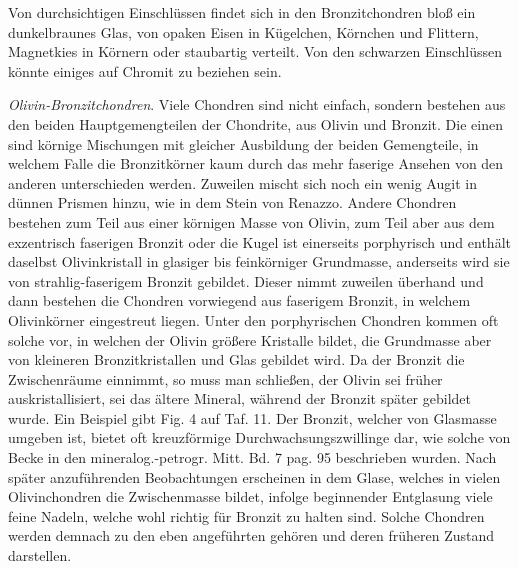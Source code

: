 \documentclass[a4paper, 12pt, oneside]{article}
\begin{document}
Von durchsichtigen Einschlüssen findet sich in den Bronzitchondren bloß ein dunkelbraunes Glas, von opaken Eisen in Kügelchen, Körnchen und Flittern, Magnetkies in Körnern oder staubartig verteilt. Von den schwarzen Einschlüssen könnte einiges auf Chromit zu beziehen sein.

\emph{Olivin-Bronzitchondren}. Viele Chondren sind nicht einfach, sondern bestehen aus den beiden Hauptgemengteilen der Chondrite, aus Olivin und Bronzit. Die einen sind körnige Mischungen mit gleicher Ausbildung der beiden Gemengteile, in welchem Falle die Bronzitkörner kaum durch das mehr faserige Ansehen von den anderen unterschieden werden. Zuweilen mischt sich noch ein wenig Augit in dünnen Prismen hinzu, wie in dem Stein von Renazzo. Andere Chondren bestehen zum Teil aus einer körnigen Masse von Olivin, zum Teil aber aus dem exzentrisch faserigen Bronzit oder die Kugel ist einerseits porphyrisch und enthält daselbst Olivinkristall in glasiger bis feinkörniger Grundmasse, anderseits wird sie von strahlig-faserigem Bronzit gebildet. Dieser nimmt zuweilen überhand und dann bestehen die Chondren vorwiegend aus faserigem Bronzit, in welchem Olivinkörner eingestreut liegen. Unter den porphyrischen Chondren kommen oft solche vor, in welchen der Olivin größere Kristalle bildet, die Grundmasse aber von kleineren Bronzitkristallen und Glas gebildet wird. Da der Bronzit die Zwischenräume einnimmt, so muss man schließen, der Olivin sei früher auskristallisiert, sei das ältere Mineral, während der Bronzit später gebildet wurde. Ein Beispiel gibt Fig. 4 auf Taf. 11. Der Bronzit, welcher von Glasmasse umgeben ist, bietet oft kreuzförmige Durchwachsungszwillinge dar, wie solche von Becke in den mineralog.-petrogr. Mitt. Bd. 7 pag. 95 beschrieben wurden. Nach später anzuführenden Beobachtungen erscheinen in dem Glase, welches in vielen Olivinchondren die Zwischenmasse bildet, infolge beginnender Entglasung viele feine Nadeln, welche wohl richtig für Bronzit zu halten sind. Solche Chondren werden demnach zu den eben angeführten gehören und deren früheren Zustand darstellen.
\end{document}
